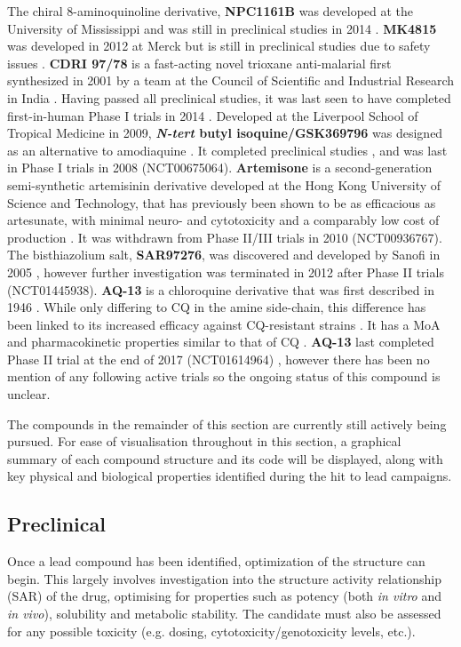 \documentclass[twocolumn]{bmcart}%
\begin{document}
The chiral 8-aminoquinoline derivative, \textbf{NPC1161B} was developed at the University of Mississippi and was still in preclinical studies in 2014 \cite{McChesney1997,Tekwani2006,Nanayakkara2008,Marcsisin2014}. \textbf{MK4815} was developed in 2012 at Merck but is still in preclinical studies due to safety issues \cite{Powles2012}. \textbf{CDRI 97/78} is a fast-acting novel trioxane anti-malarial first synthesized in 2001 by a team at the Council of Scientific and Industrial Research in India \cite{Singh2001}. Having passed all preclinical studies, it was last seen to have completed first-in-human Phase I trials in 2014 \cite{Shafiq2014}. Developed at the Liverpool School of Tropical Medicine in 2009, \textbf{\textit{N-tert} butyl isoquine/GSK369796} was designed as an alternative to amodiaquine \cite{ONeill2009,Bora2010}. It completed preclinical studies \cite{ONeill2009a}, and was last in Phase I trials in 2008 (NCT00675064). \textbf{Artemisone} is a second-generation semi-synthetic artemisinin derivative developed at the Hong Kong University of Science and Technology, that has previously been shown to be as efficacious as artesunate, with minimal neuro- and cytotoxicity and a comparably low cost of production \cite{Haynes2006}. It was withdrawn from Phase II/III trials in 2010 (NCT00936767). The bisthiazolium salt, \textbf{SAR97276}, was discovered and developed by Sanofi in 2005 \cite{Nicolas2005}, however further investigation was terminated in 2012 after Phase II trials (NCT01445938). \textbf{AQ-13} is a chloroquine derivative that was first described in 1946 \cite{Drake1946}. While only differing to CQ in the amine side-chain, this difference has been linked to its increased efficacy against CQ-resistant strains \cite{Ramanathan-Girish2004}. It has a MoA and pharmacokinetic properties similar to that of CQ \cite{Saenz2012,Mzayek2007}. \textbf{AQ-13} last completed Phase II trial at the end of 2017 (NCT01614964) \cite{Koita2017}, however there has been no mention of any following active trials so the ongoing status of this compound is unclear.

The compounds in the remainder of this section are currently still actively being pursued. For ease of visualisation throughout in this section, a graphical summary of each compound structure and its code will be displayed, along with key physical and biological properties identified during the hit to lead campaigns.

\subsection*{Preclinical}
Once a lead compound has been identified, optimization of the structure can begin. This largely involves investigation into the structure activity relationship (SAR) of the drug, optimising for properties such as potency (both \textit{in vitro} and \textit{in vivo}), solubility and metabolic stability. The candidate must also be assessed for any possible toxicity (e.g. dosing, cytotoxicity/genotoxicity levels, etc.).
\end{document}
